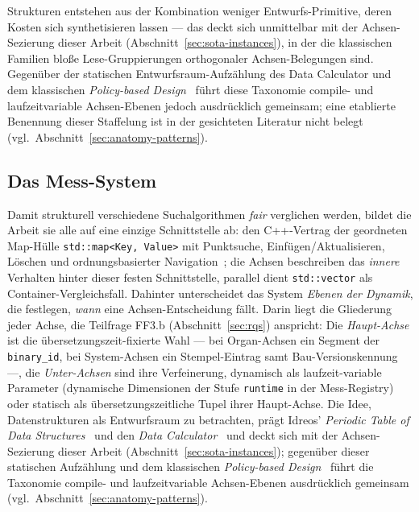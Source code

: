 \begin{nurlang}
Strukturen entstehen aus der Kombination weniger Entwurfs-Primitive, deren Kosten sich synthetisieren
lassen --- das deckt sich unmittelbar mit der Achsen-Sezierung dieser Arbeit
(Abschnitt~\ref{sec:sota-instances}), in der die klassischen Familien bloße Lese-Gruppierungen
orthogonaler Achsen-Belegungen sind. Gegenüber der statischen
Entwurfsraum-Aufzählung des Data Calculator und dem klassischen
\emph{Policy-based Design}~\cite{alexandrescu2001modern} führt diese Taxonomie compile- und
laufzeitvariable Achsen-Ebenen jedoch ausdrücklich gemeinsam; eine etablierte Benennung dieser
Staffelung ist in der gesichteten Literatur nicht belegt (vgl.\ Abschnitt~\ref{sec:anatomy-patterns}).
\end{nurlang}
\begin{nurkurz}
\section{Das Mess-System}\label{sec:measurement-system}
Damit strukturell verschiedene Suchalgorithmen \emph{fair} verglichen werden, bildet die Arbeit sie alle auf
eine einzige Schnittstelle ab: den C++-Vertrag der geordneten Map-Hülle \texttt{std::map<Key,\,Value>} mit
Punktsuche, Einfügen/Aktualisieren, Löschen und ordnungsbasierter Navigation~\cite{iso_cpp}; die Achsen
beschreiben das \emph{innere} Verhalten hinter dieser festen Schnittstelle, parallel dient \texttt{std::vector}
als Container-Vergleichsfall. Dahinter unterscheidet das System \emph{Ebenen der Dynamik}, die festlegen,
\emph{wann} eine Achsen-Entscheidung fällt. Darin liegt die Gliederung jeder Achse, die Teilfrage FF3.b
(Abschnitt~\ref{sec:rqs}) anspricht: Die \emph{Haupt-Achse} ist die übersetzungszeit-fixierte Wahl --- bei
Organ-Achsen ein Segment der \texttt{binary\_id}, bei System-Achsen ein Stempel-Eintrag samt
Bau-Versionskennung ---, die \emph{Unter-Achsen} sind ihre Verfeinerung, dynamisch als laufzeit-variable
Parameter (dynamische Dimensionen der Stufe \texttt{runtime} in der Mess-Registry) oder statisch als
übersetzungszeitliche Tupel ihrer Haupt-Achse. Die Idee, Datenstrukturen als Entwurfsraum zu betrachten, prägt
Idreos' \emph{Periodic Table of Data Structures}~\cite{idreos2018periodic} und den \emph{Data
Calculator}~\cite{idreos2018datacalculator} und deckt sich mit der Achsen-Sezierung dieser Arbeit
(Abschnitt~\ref{sec:sota-instances}); gegenüber dieser statischen Aufzählung und dem klassischen
\emph{Policy-based Design}~\cite{alexandrescu2001modern} führt die Taxonomie compile- und laufzeitvariable
Achsen-Ebenen ausdrücklich gemeinsam (vgl.\ Abschnitt~\ref{sec:anatomy-patterns}).
\end{nurkurz}

